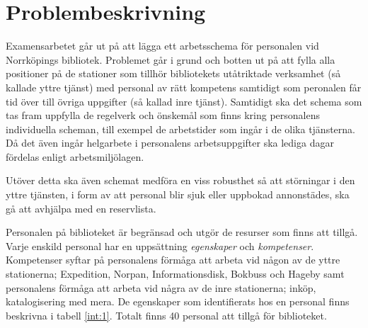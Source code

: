 


\section{Problembeskrivning}
Examensarbetet går ut på att lägga ett arbetsschema för personalen vid Norrköpings bibliotek. Problemet går i grund och botten ut på att fylla alla positioner på de stationer som tillhör bibliotekets utåtriktade verksamhet (så kallade yttre tjänst) med personal av rätt kompetens samtidigt som peronalen får tid över till övriga uppgifter (så kallad inre tjänst). Samtidigt ska det schema som tas fram uppfylla de regelverk och önskemål som finns kring personalens individuella scheman, till exempel de arbetstider som ingår i de olika tjänsterna. Då det även ingår helgarbete i personalens arbetsuppgifter ska lediga dagar fördelas enligt arbetsmiljölagen.

Utöver detta ska även schemat medföra en viss robusthet så att störningar i den yttre tjänsten, i form av att personal blir sjuk eller uppbokad annonstädes, ska gå att avhjälpa med en reservlista.

Personalen på biblioteket är begränsad och utgör de resurser som finns att tillgå. Varje enskild personal har en uppsättning \textit{egenskaper} och \textit{kompetenser}. Kompetenser syftar på personalens förmåga att arbeta vid någon av de yttre stationerna; Expedition, Norpan, Informationsdisk, Bokbuss och Hageby samt personalens förmåga att arbeta vid några av de inre stationerna; inköp, katalogisering med mera. De egenskaper som identifierats hos en personal finns beskrivna i tabell \ref{int:1}. Totalt finns 40 personal att tillgå för biblioteket.

